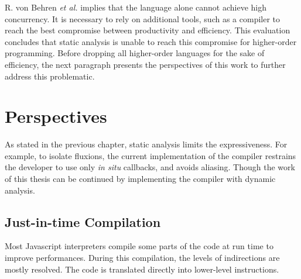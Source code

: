 R. von Behren \textit{et al.} implies that the language alone cannot achieve high concurrency.
It is necessary to rely on additional tools, such as a compiler to reach the best compromise between productivity and efficiency.
This evaluation concludes that static analysis is unable to reach this compromise for higher-order programming.
Before dropping all higher-order languages for the sake of efficiency, the next paragraph presents the perspectives of this work to further address this problematic.






\section{Perspectives} \label{chapter5:evaluation:perspective}

As stated in the previous chapter, static analysis limits the expressiveness.
For example, to isolate fluxions, the current implementation of the compiler restrains the developer to use only \textit{in situ} callbacks, and avoids aliasing.
Though the work of this thesis can be continued by implementing the compiler with dynamic analysis.

\subsection{Just-in-time Compilation}

Most Javascript interpreters compile some parts of the code at run time to improve performances.
During this compilation, the levels of indirections are mostly resolved.
The code is translated directly into lower-level instructions.

